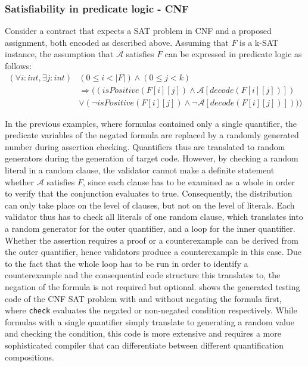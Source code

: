 \subsubsection{Satisfiability in predicate logic - CNF}
Consider a contract that expects a SAT problem in CNF and a proposed assignment, both encoded as described above. Assuming that $F$ is a k-SAT instance, the assumption that $\mathcal{A}$ satisfies $F$ can be expressed in predicate logic as follows:
\begin{equation}\label{eq:cnf_sat}
\begin{aligned}
(\forall i : int, \exists j : int) &(0 \leq i < |F|) \wedge (0 \leq j < k) \\
&\Rightarrow ((isPositive(F[i][j]) \wedge \mathcal{A}[decode(F[i][j])]) \\
&\vee (\neg isPositive(F[i][j]) \wedge \neg \mathcal{A}[decode(F[i][j])])))
\end{aligned}
\end{equation}

In the previous examples, where formulas contained only a single quantifier, the predicate variables of the negated formula are replaced by a randomly generated number during assertion checking. Quantifiers thus are translated to random generators during the generation of target code. However, by checking a random literal in a random clause, the validator cannot make a definite statement whether $\mathcal{A}$ satisfies $F$, since each clause has to be examined as a whole in order to verify that the conjunction evaluates to true. Consequently, the distribution can only take place on the level of clauses, but not on the level of literals. Each validator thus has to check all literals of one random clause, which translates into a random generator for the outer quantifier, and a loop for the inner quantifier. Whether the assertion requires a proof or a counterexample can be derived from the outer quantifier, hence validators produce a counterexample in this case. Due to the fact that the whole loop has to be run in order to identify a counterexample and the consequential code structure this translates to, the negation of the formula is not required but optional.  shows the generated testing code of the CNF SAT problem with and without negating the formula first, where \texttt{check} evaluates the negated or non-negated condition respectively. While formulas with a single quantifier simply translate to generating a random value and checking the condition, this code is more extensive and requires a more sophisticated compiler that can differentiate between different quantification compositions.

